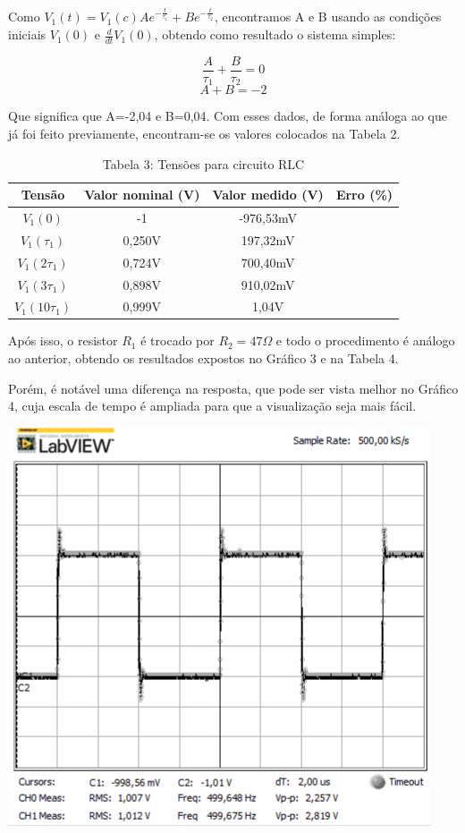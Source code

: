 \documentclass[a4 paper]{article}
\begin{document}
Como $V_1(t)=V_1(c)Ae^{-\frac{t}{\tau_1}}+Be^{-\frac{t}{\tau_2}}$, encontramos A e B usando as condições iniciais $V_1(0)$ e $\frac{d}{dt}V_1(0)$, obtendo como resultado o sistema simples:

\[\frac{A}{\tau_1}+\frac{B}{\tau_2}=0\]
\[A+B=-2\]

Que significa que A=-2,04 e B=0,04. Com esses dados, de forma análoga ao que já foi feito previamente, encontram-se os valores colocados na Tabela 2.

\vspace{5pt}
\begin{table}[h]
\centering
\begin{tabular}{|c|c|c|c|}
\hline
Tensão & Valor nominal (V) & Valor medido (V) & Erro (\%) \\\hline
$V_1(0)$ & -1 & -976,53mV & \\    \hline
$V_1(\tau_1)$ & 0,250V & 197,32mV & \\    \hline
$V_1(2\tau_1)$ & 0,724V & 700,40mV & \\\hline
$V_1(3\tau_1)$ & 0,898V & 910,02mV & \\\hline
$V_1(10\tau_1)$ & 0,999V & 1,04V & \\\hline
\end{tabular}
\caption*{Tabela 3: Tensões para circuito RLC}
\end{table}



Após isso, o resistor $R_1$ é trocado por $R_2=47\Omega$ e todo o procedimento é análogo ao anterior, obtendo os resultados expostos no Gráfico 3 e na Tabela 4.


Porém, é notável uma diferença na resposta, que pode ser vista melhor no Gráfico 4, cuja escala de tempo é ampliada para que a visualização seja mais fácil.


\begin{table}[h]
\centering
\includegraphics[scale=0.6]{rgadicoas/rgadicoa3}
\end{table}
\end{document}
